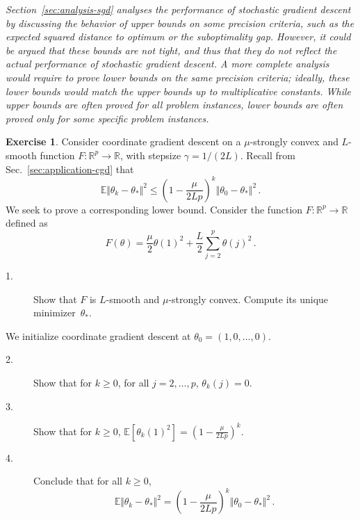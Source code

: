 \documentclass[11pt,reqno]{article}
\newcommand{\E}{\mathbb{E}}
\newcommand{\R}{\mathbb{R}}
\renewcommand{\leq}{\leqslant}
\renewcommand{\geq}{\geqslant}
\numberwithin{equation}{section}
\theoremstyle{plain}
\theoremstyle{definition}
\newtheorem{exercice}[assumption]{Exercise}
\theoremstyle{remark}
\begin{document}
\emph{Section~\ref{sec:analysis-sgd} analyses the performance of stochastic gradient descent by discussing the behavior of upper bounds on some precision criteria, such as the expected squared distance to optimum or the suboptimality gap. However, it could be argued that these bounds are not tight, and thus that they do not reflect the actual performance of stochastic gradient descent. A more complete analysis would require to prove lower bounds on the same precision criteria; ideally, these lower bounds would match the upper bounds up to multiplicative constants. While upper bounds are often proved for all problem instances, lower bounds are often proved only for some specific problem instances. }

\begin{exercice}
	Consider coordinate gradient descent on a $\mu$-strongly convex and $L$-smooth function $F:\R^p \to \R$, with stepsize $\gamma = 1/(2L)$. Recall from Sec.~\ref{sec:application-cgd} that 
	\begin{equation*}
	\E \Vert \theta_k - \theta_* \Vert^2 \leq \left(1 - \frac{\mu}{2Lp}\right)^k \Vert \theta_0 - \theta_* \Vert^2 \, .
\end{equation*}
We seek to prove a corresponding lower bound. Consider the function $F:\R^p \to \R$ defined as 
\begin{equation*}
	F(\theta) = \frac{\mu}{2} \theta(1)^2 + \frac{L}{2} \sum_{j=2}^p \theta(j)^2 \, .
\end{equation*}
\begin{description}
	\item[1.] Show that $F$ is $L$-smooth and $\mu$-strongly convex. Compute its unique minimizer~$\theta_*$.
\end{description}
We initialize coordinate gradient descent at $\theta_0 = (1,0,\dots,0)$. 
\begin{description}
	\item[2.] Show that for $k \geq 0$, for all $j =2, \dots, p$, $\theta_k(j) = 0$.
	\item[3.] Show that for $k \geq 0$, $\E \left[\theta_k(1)^2\right] = \left(1 - \frac{\mu}{2Lp}\right)^k$.
	\item[4.] Conclude that for all $k \geq 0$,
	\begin{equation*}
		\E \Vert \theta_k - \theta_* \Vert^2 = \left(1 - \frac{\mu}{2Lp}\right)^k \Vert \theta_0 - \theta_* \Vert^2 \, .
	\end{equation*}
\end{description}
\end{exercice}
\end{document}
